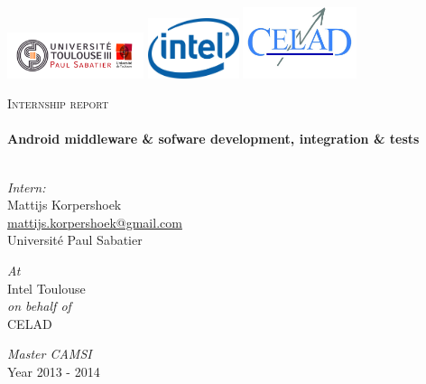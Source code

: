 \begin{titlepage}


\begin{minipage}{\textwidth}
\includegraphics[width=0.30\textwidth]{./src/img/logoups.jpg}
\hfill \includegraphics[width=0.20\textwidth]{./src/img/logointel.jpg} \hfill
\includegraphics[width=0.25\textwidth]{./src/img/logocelad.jpg}
\end{minipage}

\begin{center}

\vfill

\textsc{\LARGE Internship report}\\[0.5cm]

\titleRule \\[0.4cm]
{ \huge \bfseries Android middleware \& sofware development, integration \& tests}\\[0.4cm]

\titleRule \\[1.5cm]

\vfill

\begin{minipage}{0.4\textwidth}
\begin{flushleft} \large
\emph{Intern:}\\
Mattijs Korpershoek\\
\href{mailto:mattijs.korpershoek@gmail.com}{mattijs.korpershoek@gmail.com}\\
Université Paul Sabatier\\
\end{flushleft}
\end{minipage}
\begin{minipage}{0.4\textwidth}
\begin{flushright} \large
\emph{At} \\
Intel Toulouse \\
\emph{on behalf of}\\
CELAD\\
\end{flushright}
\end{minipage}

\vfill

\emph{Master CAMSI}\\
Year 2013 - 2014

\end{center}

\end{titlepage}
